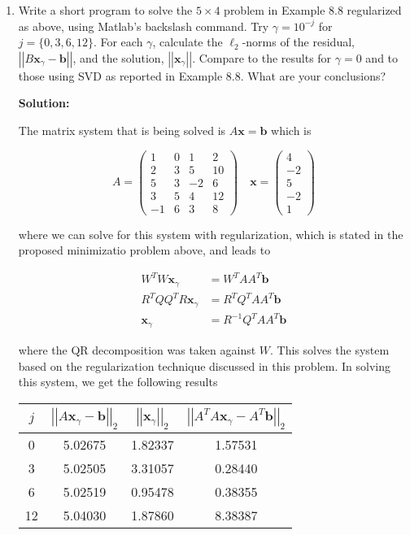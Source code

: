 \documentclass[12pt]{article}
\newcommand{\norm}[1]{\left|\left| #1 \right|\right|}
\newcommand{\vect}{\mathbf}
\newcommand{\inv}[1]{ #1^{-1}}
\begin{document}
\begin{enumerate}
\begin{enumerate}
  \item Write a short program to solve the $5 \times 4$ problem in Example 8.8 regularized
  as above, using {\sc Matlab}'s backslash command. Try $\gamma = 10^{-j}$ for
  $j = \{ 0, 3, 6, 12\}$. For each $\gamma$, calculate the $\ell_{2}$-norms of the
  residual, $\norm{B\mathbf{x}_{\gamma} - \mathbf{b}}$, and the solution, $\norm{\mathbf{x}_{\gamma}}$.
  Compare to the results for $\gamma = 0$ and to those using SVD as reported in
  Example 8.8. What are your conclusions?

  {\bf Solution:}

  The matrix system that is being solved is $A\vect{x} = \vect{b}$ which is

  \[
        A = \begin{pmatrix}1 & 0 & 1 & 2\\
                           2 & 3 & 5 & 10\\
                           5 & 3 & -2& 6\\
                           3 & 5 & 4 & 12\\
                           -1 & 6 & 3 & 8\end{pmatrix}\quad \vect{x} = \begin{pmatrix}4\\-2\\5\\-2\\1\end{pmatrix}
  \]

  where we can solve for this system with regularization, which is stated in the proposed
  minimizatio problem above, and leads to

  \begin{align*}
    W^{T}W\vect{x}_{\gamma} &= W^{T}AA^{T}\vect{b}\\
    R^{T}QQ^{T}R\vect{x}_{\gamma} &= R^{T}Q^{T}AA^{T}\vect{b}\\
    \vect{x}_{\gamma} &= \inv{R}Q^{T}AA^{T}\vect{b}
  \end{align*}

  where the QR decomposition was taken against $W$. This solves the system based
  on the regularization technique discussed in this problem. In solving this system,
  we get the following results

  \begin{table}[H]
    \centering
    \begin{tabular}{c c c c}
      \hline\hline
      $j$ & $\norm{A\vect{x}_{\gamma} - \vect{b}}_{2}$ & $\norm{\vect{x}_{\gamma}}_{2}$ & $\norm{A^{T}A\vect{x}_{\gamma} - A^{T}\vect{b}}_{2}$\\
      \hline
      0 & 5.02675 & 1.82337 & 1.57531\\
      3 & 5.02505 & 3.31057 & 0.28440\\
      6 & 5.02519 & 0.95478 & 0.38355\\
      12 & 5.04030 & 1.87860 & 8.38387\\
      \hline
    \end{tabular}
  \end{table}


\end{enumerate}
\end{enumerate}
\end{document}
